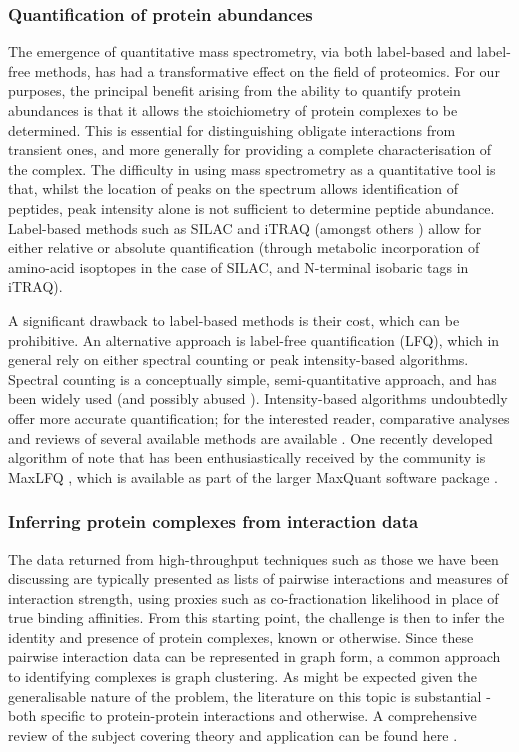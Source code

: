\documentclass[a4paper,11pt,twoside,openright]{scrbook}
\begin{document}
\subsubsection{Quantification of protein abundances}
The emergence of quantitative mass spectrometry, via both label-based and label-free methods, has had a transformative effect on the field of proteomics. For our purposes, the principal benefit arising from the ability to quantify protein abundances is that it allows the stoichiometry of protein complexes to be determined. This is essential for distinguishing obligate interactions from transient ones, and more generally for providing a complete characterisation of the complex. The difficulty in using mass spectrometry as a quantitative tool is that, whilst the location of peaks on the spectrum allows identification of peptides, peak intensity alone is not sufficient to determine peptide abundance. Label-based methods such as SILAC \cite{Ong2002a} and iTRAQ \cite{Ross2004} (amongst others \cite{Gygi1999,Thompson2003}) allow for either relative or absolute quantification (through metabolic incorporation of amino-acid isoptopes in the case of SILAC, and N-terminal isobaric tags in iTRAQ).

A significant drawback to label-based methods is their cost, which can be prohibitive. An alternative approach is label-free quantification (LFQ), which in general rely on either spectral counting \cite{Liu2004,Zybailov2005} or peak intensity-based algorithms. Spectral counting is a conceptually simple, semi-quantitative approach, and has been widely used (and possibly abused \cite{Lundgren2010}). Intensity-based algorithms undoubtedly offer more accurate quantification; for the interested reader, comparative analyses and reviews of several available methods are available \cite{Nahnsen2013,Fabre2014}. One recently developed algorithm of note that has been enthusiastically received by the community is MaxLFQ \cite{Cox2014}, which is available as part of the larger MaxQuant software package \cite{Cox2008}.

\subsubsection{Inferring protein complexes from interaction data}
The data returned from high-throughput techniques such as those we have been discussing are typically presented as lists of pairwise interactions and measures of interaction strength, using proxies such as co-fractionation likelihood in place of true binding affinities. From this starting point, the challenge is then to infer the identity and presence of protein complexes, known or otherwise. Since these pairwise interaction data can be represented in graph form, a common approach to identifying complexes is graph clustering. As might be expected given the generalisable nature of the problem, the literature on this topic is substantial - both specific to protein-protein interactions and otherwise. A comprehensive review of the subject covering theory and application can be found here \cite{Schaeffer2007}.
\end{document}
